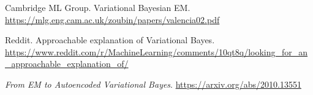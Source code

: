 \documentclass[11pt]{article}
\begin{document}
\begin{enumerate}[leftmargin=1.2em,label={[\arabic*]}]
\item Cambridge ML Group. Variational Bayesian EM. \url{https://mlg.eng.cam.ac.uk/zoubin/papers/valencia02.pdf}
\item Reddit. Approachable explanation of Variational Bayes. \url{https://www.reddit.com/r/MachineLearning/comments/10qt8q/looking_for_an_approachable_explanation_of/}
\item \emph{From EM to Autoencoded Variational Bayes}. \url{https://arxiv.org/abs/2010.13551}
\end{enumerate}
\end{document}
